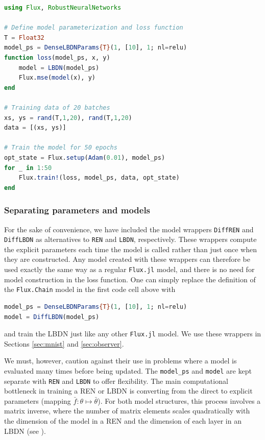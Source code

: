 \begin{lstlisting}[language = Julia]
using Flux, RobustNeuralNetworks

# Define model parameterization and loss function
T = Float32
model_ps = DenseLBDNParams{T}(1, [10], 1; nl=relu)
function loss(model_ps, x, y) 
    model = LBDN(model_ps)
    Flux.mse(model(x), y)
end

# Training data of 20 batches
xs, ys = rand(T,1,20), rand(T,1,20)
data = [(xs, ys)]

# Train the model for 50 epochs
opt_state = Flux.setup(Adam(0.01), model_ps)
for _ in 1:50
    Flux.train!(loss, model_ps, data, opt_state)
end
\end{lstlisting}

\subsubsection{Separating parameters and models} \label{sec:separate-params}

For the sake of convenience, we have included the model wrappers \verb|DiffREN| and \verb|DiffLBDN| as alternatives to \verb|REN| and \verb|LBDN|, respectively. These wrappers compute the explicit parameters each time the model is called rather than just once when they are constructed. Any model created with these wrappers can therefore be used exactly the same way as a regular \verb|Flux.jl| model, and there is no need for model construction in the loss function. One can simply replace the definition of the \verb|Flux.Chain| model in the first code cell above with
\begin{lstlisting}[language = Julia]
model_ps = DenseLBDNParams{T}(1, [10], 1; nl=relu)
model = DiffLBDN(model_ps)
\end{lstlisting}
and train the LBDN just like any other \verb|Flux.jl| model. We use these wrappers in Sections \ref{sec:mnist} and \ref{sec:observer}.

We must, however, caution against their use in problems where a model is evaluated many times before being updated. The \verb|model_ps| and \verb|model| are kept separate with \verb|REN| and \verb|LBDN| to offer flexibility. The main computational bottleneck in training a REN or LBDN is converting from the direct to explicit parameters (mapping $\bar{f}: \theta \mapsto \bar{\theta}$). For both model structures, this process involves a matrix inverse, where the number of matrix elements scales quadratically with the dimension of the model in a REN and the dimension of each layer in an LBDN (see \cite{Revay++2021b,Wang+Manchester2023}).


